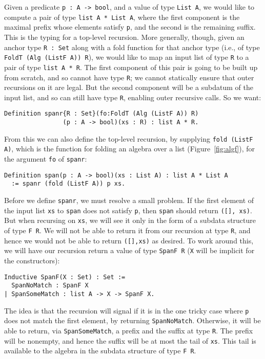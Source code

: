 \documentclass[a4paper,USenglish]{lipics-v2021}
\begin{document}
Given a predicate \verb|p : A -> bool|, and a value of type
\verb|List A|, we would like to compute a pair of type
\verb|list A * List A|, where the first component is the maximal
prefix whose elements satisfy \verb|p|, and the second is the
remaining suffix.  This is the typing for a top-level recursion.  More
generally, though, given an anchor type \verb|R : Set| along with a
fold function for that anchor type (i.e., of type \verb|FoldT (Alg (ListF A)) R|),
we would like to map an input list of type \verb|R| to a pair of
type \verb|list A * R|.  The first component of this pair is
going to be built up from scratch, and so cannot have type \verb|R|;
we cannot statically ensure that outer recursions on it are legal.
But the second component will be a subdatum of the input list,
and so can still have type \verb|R|, enabling outer recursive calls.  So we want: 
\begin{verbatim}
Definition spanr{R : Set}(fo:FoldT (Alg (ListF A)) R)
                (p : A -> bool)(xs : R) : list A * R.
\end{verbatim}
\noindent From this we can also define the top-level recursion, by
supplying \verb|fold (ListF A)|, which is the function for folding an algebra
over a list (Figure~\ref{fig:algf}), for the argument \verb|fo| of \verb|spanr|:
\begin{verbatim}
Definition span(p : A -> bool)(xs : List A) : list A * List A
  := spanr (fold (ListF A)) p xs.
\end{verbatim} 

Before we define \verb|spanr|, we must resolve a small problem.
If the first element of the input list
\verb|xs| to \verb|span| does not satisfy \verb|p|, then \verb|span|
should return \verb|([], xs)|.  But when recursing on \verb|xs|, we
will see it only in the form of a subdata structure of type
\verb|F R|.  We will not be able to return it from our recursion at
type \verb|R|, and hence we would not be able to return \verb|([],xs)|
as desired.  To work around this, we will have our recursion return a value
of type \verb|SpanF R| (\verb|X| will be implicit for the constructors):
\begin{verbatim}
Inductive SpanF(X : Set) : Set :=
  SpanNoMatch : SpanF X
| SpanSomeMatch : list A -> X -> SpanF X.
\end{verbatim}
\noindent The idea is that the recursion will signal if it is in the
one tricky case where \verb|p| does not match the first element, by
returning \verb|SpanNoMatch|.  Otherwise, it will be able to return,
via \verb|SpanSomeMatch|, a prefix and the suffix at type
\verb|R|. The prefix will be nonempty, and hence the suffix will be at
most the tail of \verb|xs|.  This tail is available to the algebra
in the subdata structure of type \verb|F R|.
\end{document}
